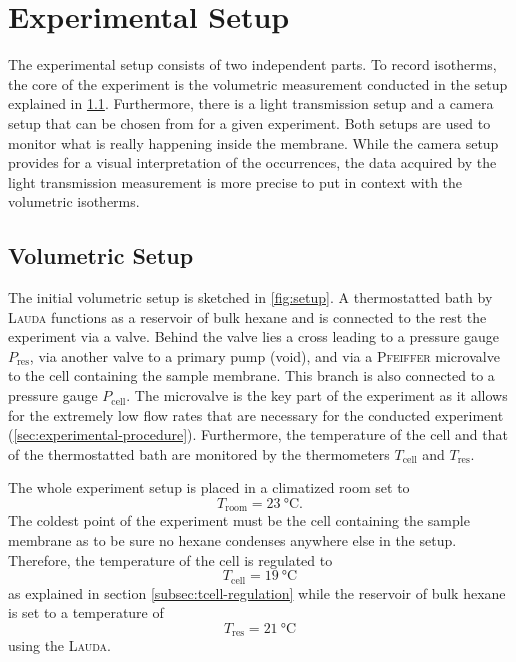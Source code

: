 \documentclass[../thesis.tex]{subfiles}
\begin{document}
    \section{Experimental Setup}
    \label{sec:exp-setup}

        The experimental setup consists of two independent parts. To record isotherms, the core of the experiment is the volumetric measurement conducted in the setup explained in \cref{subsec:volumetric-setup}. Furthermore, there is a light transmission setup and a camera setup that can be chosen from for a given experiment. Both setups are used to monitor what is really happening inside the membrane. While the camera setup provides for a visual interpretation of the occurrences, the data acquired by the light transmission measurement is more precise to put in context with the volumetric isotherms.


        \subsection{Volumetric Setup}
        \label{subsec:volumetric-setup}

            The initial volumetric setup is sketched in \cref{fig:setup}. A thermostatted bath by \textsc{Lauda} functions as a reservoir of bulk hexane and is connected to the rest the experiment via a valve. Behind the valve lies a cross leading to a pressure gauge $P_\mathrm{res}$, via another valve to a primary pump (void), and via a \textsc{Pfeiffer} microvalve to the cell containing the sample membrane. This branch is also connected to a pressure gauge $P_\mathrm{cell}$. The microvalve is the key part of the experiment as it allows for the extremely low flow rates that are necessary for the conducted experiment (\cref{sec:experimental-procedure}). Furthermore, the temperature of the cell and that of the thermostatted bath are monitored by the thermometers $T_\mathrm{cell}$ and $T_\mathrm{res}$.
            \medskip

            

            The whole experiment setup is placed in a climatized room set to \begin{equation}
                T_\mathrm{room} = \SI{23}{\celsius}.
            \end{equation}
            The coldest point of the experiment must be the cell containing the sample membrane as to be sure no hexane condenses anywhere else in the setup. Therefore, the temperature of the cell is regulated to
            \begin{equation}
                T_\mathrm{cell} = \SI{19}{\celsius}
            \end{equation}
            as explained in section \cref{subsec:tcell-regulation} while the reservoir of bulk hexane is set to a temperature of
            \begin{equation}
                T_\mathrm{res} = \SI{21}{\celsius}
            \end{equation}
            using the \textsc{Lauda}.
\end{document}
